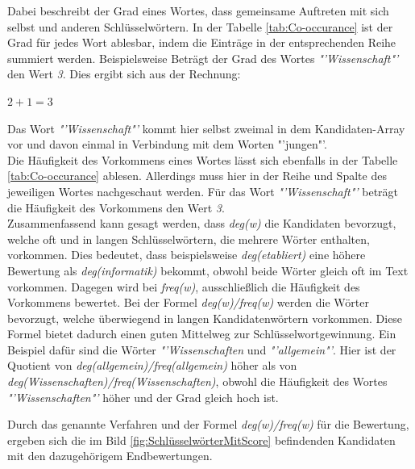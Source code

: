 	Dabei beschreibt der Grad eines Wortes, dass gemeinsame Auftreten mit sich selbst und anderen Schlüsselwörtern. In der Tabelle \ref{tab:Co-occurance} ist der Grad für jedes Wort ablesbar, indem die Einträge in der entsprechenden Reihe summiert werden. Beispielsweise Beträgt der Grad des Wortes \textit{"'Wissenschaft"'} den Wert \textit{3}. Dies ergibt sich aus der Rechnung:
	\begin{center}
		$2 + 1 = 3$
	\end{center}
	Das Wort \textit{"'Wissenschaft"'} kommt hier selbst zweimal in dem Kandidaten-Array vor und davon einmal in Verbindung mit dem Worten "'jungen"'.\\
	Die Häufigkeit des Vorkommens eines Wortes lässt sich ebenfalls in der Tabelle \ref{tab:Co-occurance} ablesen. Allerdings muss hier in der Reihe und Spalte des jeweiligen Wortes nachgeschaut werden. Für das Wort \textit{"'Wissenschaft"'} beträgt die Häufigkeit des Vorkommens den Wert \textit{3}.\\
	Zusammenfassend kann gesagt werden, dass \textit{deg(w)} die Kandidaten bevorzugt, welche oft und in langen Schlüsselwörtern, die mehrere Wörter enthalten, vorkommen. Dies bedeutet, dass beispielsweise \textit{deg(etabliert)} eine höhere Bewertung als \textit{deg(informatik)} bekommt, obwohl beide Wörter gleich oft im Text vorkommen. Dagegen wird bei \textit{freq(w)}, ausschließlich die Häufigkeit des Vorkommens bewertet. Bei der Formel \textit{deg(w)/freq(w)} werden die Wörter bevorzugt, welche überwiegend in langen Kandidatenwörtern vorkommen. Diese Formel bietet dadurch einen guten Mittelweg zur Schlüsselwortgewinnung. Ein Beispiel dafür sind die Wörter \textit{"'Wissenschaften} und \textit{"'allgemein"'}. Hier ist der Quotient von \textit{deg(allgemein)/freq(allgemein)} höher als von \textit{deg(Wissenschaften)/freq(Wissenschaften)}, obwohl die Häufigkeit des Wortes \textit{"'Wissenschaften"'} höher und der Grad gleich hoch ist. \cite{rose2010automatic}
	
	Durch das genannte Verfahren und der Formel \textit{deg(w)/freq(w)} für die Bewertung, ergeben sich die im Bild \ref{fig:SchlüsselwörterMitScore} befindenden Kandidaten mit den dazugehörigem Endbewertungen. \cite{rose2010automatic}
	
